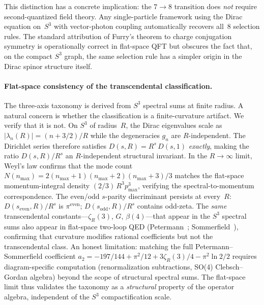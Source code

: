 \documentclass[aps,pra,twocolumn,superscriptaddress,longbibliography]{revtex4-2}
\begin{document}
This distinction has a concrete implication: the $7 \to 8$ transition
does \emph{not} require second-quantized field theory.  Any
single-particle framework using the Dirac equation on~$S^3$ with
vector-photon coupling automatically recovers all~8 selection rules.
The standard attribution of Furry's theorem to charge conjugation
symmetry is operationally correct in flat-space QFT but obscures the
fact that, on the compact $S^3$ graph, the same selection rule has a
simpler origin in the Dirac spinor structure itself.

\paragraph{Flat-space consistency of the transcendental classification.}
The three-axis taxonomy is derived from $S^3$ spectral sums at finite
radius.  A natural concern is whether the classification is a
finite-curvature artifact.  We verify that it is not.
On $S^3$ of radius~$R$, the Dirac eigenvalues scale as
$|\lambda_n(R)| = (n + 3/2)/R$ while the degeneracies $g_n$ are
$R$-independent.  The Dirichlet series therefore satisfies
$D(s,R) = R^s\,D(s,1)$ \emph{exactly}, making the ratio
$D(s,R)/R^s$ an $R$-independent structural invariant.  In the
$R \to \infty$ limit, Weyl's law confirms that the mode count
$N(n_{\max}) = 2(n_{\max}+1)(n_{\max}+2)(n_{\max}+3)/3$
matches the flat-space momentum-integral density
$(2/3)\,R^3 p_{\max}^3$, verifying the spectral-to-momentum
correspondence.  The even/odd $s$-parity discriminant persists at
every~$R$: $D(s_{\text{even}},R)/R^s$ is $\pi^{\text{even}}$;
$D(s_{\text{odd}},R)/R^s$ contains odd-zeta.  The \emph{same}
transcendental constants---$\zeta_R(3)$, $G$, $\beta(4)$---that
appear in the $S^3$ spectral sums also appear in flat-space
two-loop QED (Petermann~\cite{petermann1957};
Sommerfield~\cite{sommerfield1957}), confirming that curvature
modifies rational coefficients but not the transcendental class.
An honest limitation: matching the full Petermann--Sommerfield
coefficient $a_2 = -197/144 + \pi^2/12 + 3\zeta_R(3)/4
- \pi^2 \ln 2 / 2$ requires diagram-specific computation
(renormalization subtractions, SO(4) Clebsch--Gordan algebra)
beyond the scope of structural spectral sums.
The flat-space limit thus validates the taxonomy as a
\emph{structural} property of the operator algebra, independent
of the $S^3$ compactification scale.
\end{document}
